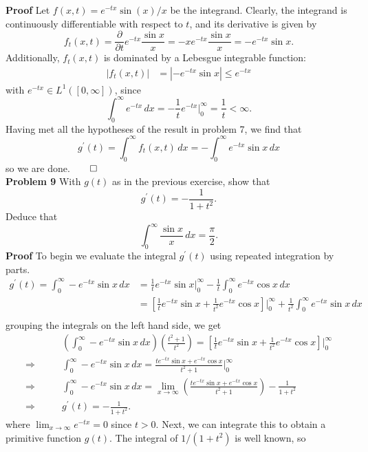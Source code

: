 \documentclass[11pt, letterpaper]{article}
\begin{document}
    {\bf Proof} Let $f(x,t)=e^{-tx}\sin(x)/x$ be the integrand. Clearly, the integrand is continuously differentiable with respect to $t$, and its derivative
    is given by
    \[f_t(x,t)=\frac{\partial}{\partial t}e^{-tx}\frac{\sin x}{x}=-xe^{-tx}\frac{\sin x}{x}=-e^{-tx}\sin x.\]
    Additionally, $f_t(x,t)$ is dominated by a Lebesgue integrable function:
    \begin{align*}
        \left|f_t(x,t)\right|&=\left|-e^{-tx}\sin x\right|
        \leq e^{-tx}
    \end{align*}
    with $e^{-tx}\in L^1([0,\infty])$, since
    \[\int_0^\infty e^{-tx}\,dx=-\frac{1}{t}e^{-tx}\bigg|_0^\infty=\frac{1}{t}<\infty.\]
    Having met all the hypotheses of the result in problem 7, we find that
    \[g^\prime(t)=\int_0^\infty f_t(x,t)\,dx=-\int_0^\infty e^{-tx}\sin x\,dx\]
    so we are done.\hfill{$\qed$}\\[10pt]
    {\bf Problem 9} With $g(t)$ as in the previous exercise, show that
    \[g^\prime(t)=-\frac{1}{1+t^2}.\]
    Deduce that
    \[\int_0^\infty\frac{\sin x}{x}\,dx=\frac{\pi}{2}.\]
    {\bf Proof} To begin we evaluate the integral $g^\prime(t)$ using repeated integration by parts.
    \begin{align*}
        g^\prime(t)=\int_0^\infty-e^{-tx}\sin x\,dx&=\frac{1}{t}e^{-tx}\sin x\bigg|_0^\infty-\frac{1}{t}\int_0^\infty e^{-tx}\cos x\,dx\\
        &=\left[\frac{1}{t}e^{-tx}\sin x+\frac{1}{t^2}e^{-tx}\cos x\right]\bigg|_0^\infty+\frac{1}{t^2}\int_0^\infty e^{-tx}\sin x\,dx\\
    \end{align*}
    grouping the integrals on the left hand side, we get
    \begin{align*}
        &\left(\int_0^\infty-e^{-tx}\sin x\,dx\right)\left(\frac{t^2+1}{t^2}\right)=\left[\frac{1}{t}e^{-tx}\sin x+\frac{1}{t^2}e^{-tx}\cos x\right]\bigg|_0^\infty\\ 
        \Rightarrow\qquad&\int_0^\infty-e^{-tx}\sin x\,dx=\frac{te^{-tx}\sin x+e^{-tx}\cos x}{t^2+1}\bigg|_0^\infty\\
        \Rightarrow\qquad&\int_0^\infty-e^{-tx}\sin x\,dx=\lim_{x\rightarrow\infty}\left(\frac{te^{-tx}\sin x+e^{-tx}\cos x}{t^2+1}\right)-\frac{1}{1+t^2}\\
        \Rightarrow\qquad&g^\prime(t)=-\frac{1}{1+t^2}.
    \end{align*}
    where $\lim_{x\rightarrow\infty}e^{-tx}=0$ since $t>0$. Next, we can integrate this to obtain a primitive function $g(t)$. The integral of $1/(1+t^2)$ is well known, so
\end{document}
